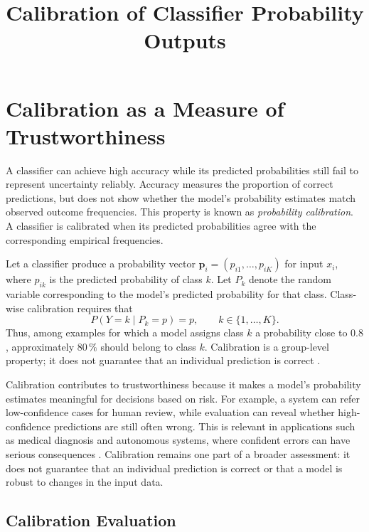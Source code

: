 \documentclass[12pt,a4paper]{article}
\title{Calibration of Classifier Probability Outputs}
\date{}
\begin{document}
\maketitle

\section{Calibration as a Measure of Trustworthiness}

A classifier can achieve high accuracy while its predicted probabilities still fail to represent uncertainty reliably. Accuracy measures the proportion of correct predictions, but does not show whether the model's probability estimates match observed outcome frequencies. This property is known as \emph{probability calibration}. A classifier is calibrated when its predicted probabilities agree with the corresponding empirical frequencies.

Let a classifier produce a probability vector $\mathbf{p}_i=(p_{i1},\ldots,p_{iK})$ for input $x_i$, where $p_{ik}$ is the predicted probability of class $k$. Let $P_k$ denote the random variable corresponding to the model's predicted probability for that class. Class-wise calibration requires that
\begin{equation}
    P(Y=k\mid P_k=p)=p, \qquad k\in\{1,\ldots,K\}.
    \label{eq:classwise-calibration}
\end{equation}
Thus, among examples for which a model assigns class $k$ a probability close to $0.8$, approximately $80\,\%$ should belong to class $k$. Calibration is a group-level property; it does not guarantee that an individual prediction is correct \cite{guo2017calibration,nixon2019measuring}.

Calibration contributes to trustworthiness because it makes a model's probability estimates meaningful for decisions based on risk. For example, a system can refer low-confidence cases for human review, while evaluation can reveal whether high-confidence predictions are still often wrong. This is relevant in applications such as medical diagnosis and autonomous systems, where confident errors can have serious consequences \cite{guo2017calibration,nixon2019measuring}. Calibration remains one part of a broader assessment: it does not guarantee that an individual prediction is correct or that a model is robust to changes in the input data.

\subsection{Calibration Evaluation}
\end{document}
